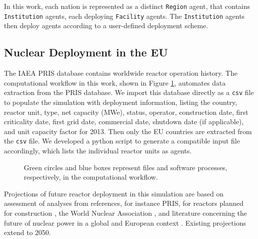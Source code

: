 In this work, each nation is represented as a distinct \texttt{Region} agent,
that contains \texttt{Institution} agents, each deploying  \texttt{Facility} 
agents. The \texttt{Institution} agents then deploy agents according to 
a user-defined deployment scheme.


\subsection{Nuclear Deployment in the \gls{EU}}

The \gls{IAEA} \gls{PRIS} database \cite{iaea_nuclear_2017} contains worldwide reactor
operation history.
The computational workflow in this work, shown in Figure \ref{diag:comp}, automates data extraction from the 
\gls{PRIS} database. We import this database directly as a \texttt{csv} file to populate the simulation
with deployment information, listing the country, reactor unit, type, net capacity (\gls{MWe}), status,
operator, construction date, first criticality date, first grid date, commercial date, shutdown
date (if applicable), and unit capacity factor for 2013. Then only the \gls{EU} countries are extracted
from the \texttt{csv} file. We developed a python script to generate
a \Cyclus 
compatible input file accordingly, which lists the individual reactor units as agents. 


\begin{figure}
        \centering
{}
\caption{Green circles and blue boxes represent files and software 
processes, respectively, in the computational workflow.}
\label{diag:comp}
\end{figure}


Projections of future reactor deployment in this simulation are based on
assessment of analyses from references, for instance \gls{PRIS}, for reactors planned
for construction \cite{iaea_nuclear_2017}, the World Nuclear Association
\cite{world_nuclear_association_nuclear_2017}, and literature concerning the future of
nuclear power in a global \cite{joskow_future_2012} and European context
\cite{hatch_politics_2015}.  Existing projections extend to 2050.

